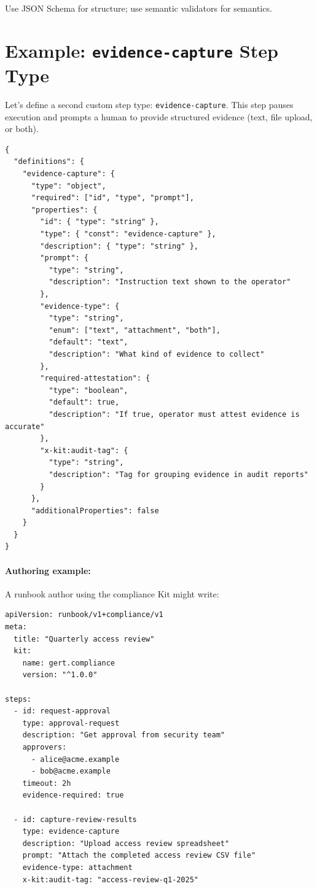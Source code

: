 Use JSON Schema for structure; use semantic validators for semantics.

\section{Example: \texttt{evidence-capture} Step Type}
\label{sec:example-evidence}

Let's define a second custom step type: \texttt{evidence-capture}. This step
pauses execution and prompts a human to provide structured evidence (text,
file upload, or both).

\begin{verbatim}
{
  "definitions": {
    "evidence-capture": {
      "type": "object",
      "required": ["id", "type", "prompt"],
      "properties": {
        "id": { "type": "string" },
        "type": { "const": "evidence-capture" },
        "description": { "type": "string" },
        "prompt": {
          "type": "string",
          "description": "Instruction text shown to the operator"
        },
        "evidence-type": {
          "type": "string",
          "enum": ["text", "attachment", "both"],
          "default": "text",
          "description": "What kind of evidence to collect"
        },
        "required-attestation": {
          "type": "boolean",
          "default": true,
          "description": "If true, operator must attest evidence is accurate"
        },
        "x-kit:audit-tag": {
          "type": "string",
          "description": "Tag for grouping evidence in audit reports"
        }
      },
      "additionalProperties": false
    }
  }
}
\end{verbatim}

\paragraph{Authoring example:}

A runbook author using the compliance Kit might write:

\begin{verbatim}
apiVersion: runbook/v1+compliance/v1
meta:
  title: "Quarterly access review"
  kit:
    name: gert.compliance
    version: "^1.0.0"

steps:
  - id: request-approval
    type: approval-request
    description: "Get approval from security team"
    approvers:
      - alice@acme.example
      - bob@acme.example
    timeout: 2h
    evidence-required: true

  - id: capture-review-results
    type: evidence-capture
    description: "Upload access review spreadsheet"
    prompt: "Attach the completed access review CSV file"
    evidence-type: attachment
    x-kit:audit-tag: "access-review-q1-2025"
\end{verbatim}

